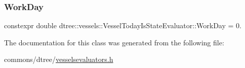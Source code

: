 \mbox{\label{classdtree_1_1vessels_1_1_vessel_today_is_state_evaluator_ac1c87e23226c4231957bdd4f509a4fac}} 
\subsubsection{\texorpdfstring{WorkDay}{WorkDay}}
{\footnotesize\ttfamily constexpr double dtree\+::vessels\+::\+Vessel\+Today\+Is\+State\+Evaluator\+::\+Work\+Day = 0.\hspace{0.3cm}{\ttfamily [static]}}



The documentation for this class was generated from the following file\+:\begin{DoxyCompactItemize}
\item 
commons/dtree/\mbox{\hyperlink{vesselsevaluators_8h}{vesselsevaluators.\+h}}\end{DoxyCompactItemize}

